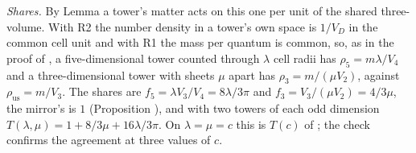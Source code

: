 \emph{Shares.} By Lemma  a tower's matter acts on this one per unit of the shared three-volume. With R2 the number density in a tower's own space is $1/V_{D}$ in the common cell unit and with R1 the mass per quantum is common, so, as in the proof of , a five-dimensional tower counted through $\lambda$ cell radii has $\rho_{5} = m\lambda/V_{4}$ and a three-dimensional tower with sheets $\mu$ apart has $\rho_{3} = m/(\mu V_{2})$, against $\rho_{\mathrm{us}} = m/V_{3}$. The shares are $f_{5} = \lambda V_{3}/V_{4} = 8\lambda/3\pi$ and $f_{3} = V_{3}/(\mu V_{2}) = 4/3\mu$, the mirror's is $1$ (Proposition ), and with two towers of each odd dimension $T(\lambda,\mu) = 1 + 8/3\mu + 16\lambda/3\pi$. On $\lambda = \mu = c$ this is $T(c)$ of ; the check confirms the agreement at three values of $c$.


